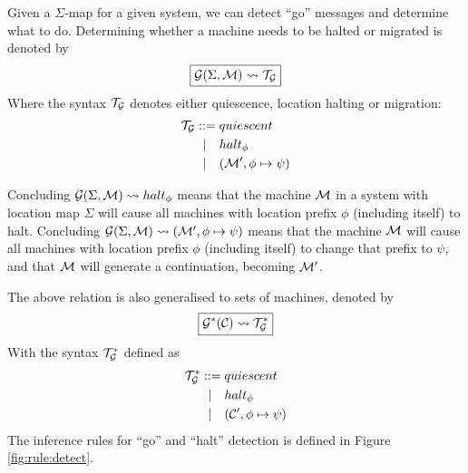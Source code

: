 \newpage

Given a $\Sigma$-map for a given system, we can detect ``go'' messages and
determine what to do. Determining whether a machine needs to be halted or
migrated is denoted by
\begin{equation*}
\boxed{\mathcal{G}(\Sigma, \mathcal{M}) \leadsto \mathcal{T}_{\mathcal{G}}}
\end{equation*}
Where the syntax $\mathcal{T}_{\mathcal{G}}$ denotes either quiescence, location halting or
migration:
\begin{align*}
  \mathcal{T}_{\mathcal{G}} ::={}& quiescent \\
       |\quad& halt_\phi \\
       |\quad& (\mathcal{M}', \phi \mapsto \psi)
\end{align*}

Concluding $\mathcal{G}(\Sigma, \mathcal{M}) \leadsto halt_\phi$ means that the machine $\mathcal{M}$ in a
system with location map $\Sigma$ will cause all machines with location prefix
$\phi$ (including itself) to halt. Concluding $\mathcal{G}(\Sigma,\mathcal{M}) \leadsto (\mathcal{M}', \phi
\mapsto \psi)$ means that the machine $\mathcal{M}$ will cause all machines with location
prefix $\phi$ (including itself) to change that prefix to $\psi$, and that $\mathcal{M}$
will generate a continuation, becoming $\mathcal{M}'$.

The above relation is also generalised to sets of machines, denoted by
\begin{equation*}
\boxed{\mathcal{G}^*(\mathcal{C}) \leadsto \mathcal{T}_{\mathcal{G}}^*}
\end{equation*}
With the syntax $\mathcal{T}_{\mathcal{G}}^*$ defined as
\begin{align*}
  \mathcal{T}_{\mathcal{G}}^* ::={}& quiescent \\
         |\quad& halt_\phi \\
         |\quad& (\mathcal{C}', \phi \mapsto \psi)
\end{align*}
The inference rules for ``go'' and ``halt'' detection is defined in Figure
\ref{fig:rule:detect}.

